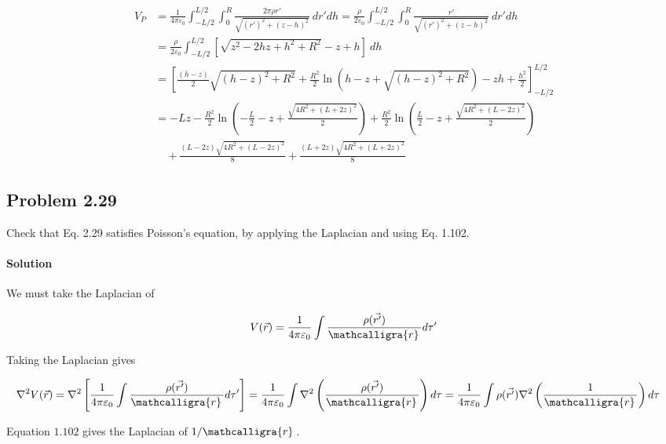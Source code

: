 \documentclass{article}
\newcommand{\scriptr}{\mathcalligra{r}\,}
\begin{document}
\begin{align*}
    V_P &= \frac{1}{4\pi \varepsilon_0} \int_{-L/2}^{L/2} \int_0^R \frac{2\pi \rho r'}{\sqrt{(r')^2 + (z - h)^2}} \ dr' dh = \frac{\rho}{2 \varepsilon_0} \int_{-L/2}^{L/2} \int_0^R \frac{r'}{\sqrt{(r')^2 + (z - h)^2}} \ dr' dh \\
    &= \frac{\rho}{2 \varepsilon_0}\int_{-L/2}^{L/2}\left[\sqrt{z^{2} - 2hz + h^{2} + R^{2}} - z + h\right]\ dh \\
    &= \left[\frac{(h - z)}{2} \sqrt{(h - z)^2 + R^2} + \frac{R^2}{2} \ln \left( h - z + \sqrt{(h - z)^2 + R^2} \right) -zh + \frac{h^2}{2}\right]_{-L/2}^{L/2} \\
    &=
- L z - \frac{R^{2}}{2} \ln \left( - \frac{L}{2} - z + \frac{\sqrt{4 R^{2} + (L + 2z)^{2}}}{2} \right) 
+ \frac{R^{2}}{2} \ln \left( \frac{L}{2} - z + \frac{\sqrt{4 R^{2} + (L - 2z)^{2}}}{2} \right) \\
&\quad + \frac{(L - 2z) \sqrt{4 R^{2} + (L - 2z)^{2}}}{8} 
+ \frac{(L + 2z) \sqrt{4 R^{2} + (L + 2z)^{2}}}{8}
\end{align*}

\newpage

\subsection*{Problem 2.29}
Check that Eq. 2.29 satisfies Poisson’s equation, by applying the Laplacian and using Eq. 1.102.

\paragraph{Solution} We must take the Laplacian of 

\begin{align*}
    V(\vec{r}) = \frac{1}{4\pi \varepsilon_0} \int \frac{\rho(\vec{r'})}{\scriptr} d\tau'
\end{align*}

Taking the Laplacian gives 

\begin{align*}
    \nabla^2 V(\vec{r}) &= \nabla^2 \left[\frac{1}{4\pi \varepsilon_0}\int \frac{\rho(\vec{r'})}{\scriptr} d\tau '\right] 
    = \frac{1}{4\pi \varepsilon_0}\int \nabla^2\left(\frac{\rho(\vec{r'})}{\scriptr}\right)d\tau
    = \frac{1}{4\pi \varepsilon_0}\int \rho(\vec{r'}) \nabla^2\left(\frac{1}{\scriptr}\right)d\tau
\end{align*}

Equation $1.102$ gives the Laplacian of $1/\scriptr$.
\end{document}

